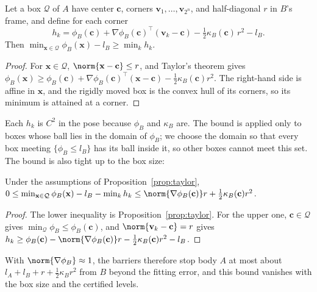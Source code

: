 \begin{proposition}\label{prop:taylor}
Let a box $\mathcal Q$ of $A$ have center $\mathbf c$, corners $\mathbf v_1,\dots,\mathbf v_{2^n}$, and
half-diagonal $r$ in $B$'s frame, and define for each corner
\begin{equation}\label{eq:corner}
h_{k}=\phi_B(\mathbf c)+\nabla\phi_B(\mathbf c)^{\top}(\mathbf v_k-\mathbf c)
-\tfrac12\kappa_B(\mathbf c)\,r^2-l_B .
\end{equation}
Then $\min_{\mathbf x\in\mathcal Q}\phi_B(\mathbf x)-l_B\ge\min_kh_k$.
\end{proposition}
\begin{proof}
For $\mathbf x\in\mathcal Q$, $\norm{\mathbf x-\mathbf c}\le r$, and Taylor's theorem gives
$\phi_B(\mathbf x)\ge\phi_B(\mathbf c)+\nabla\phi_B(\mathbf c)^\top(\mathbf x-\mathbf c)
-\tfrac12\kappa_B(\mathbf c)r^2$. The right-hand side is affine in $\mathbf x$, and the rigidly moved
box is the convex hull of its corners, so its minimum is attained at a corner.
\end{proof}
Each $h_k$ is $C^2$ in the pose because $\phi_B$ and $\kappa_B$ are. The bound is applied only to
boxes whose ball lies in the domain of $\phi_B$; we choose the domain so that every box meeting
$\{\phi_B\le l_B\}$ has its ball inside it, so other boxes cannot meet this set. The bound is also
tight up to the box size:
\begin{proposition}\label{prop:tight}
Under the assumptions of Proposition~\ref{prop:taylor},
$0\le\min_{\mathbf x\in\mathcal Q}\phi_B(\mathbf x)-l_B-\min_kh_k\le\norm{\nabla\phi_B(\mathbf c)}r
+\tfrac12\kappa_B(\mathbf c)r^2$.
\end{proposition}
\begin{proof}
The lower inequality is Proposition~\ref{prop:taylor}. For the upper one, $\mathbf c\in\mathcal Q$
gives $\min_{\mathcal Q}\phi_B\le\phi_B(\mathbf c)$, and $\norm{\mathbf v_k-\mathbf c}=r$ gives
$h_k\ge\phi_B(\mathbf c)-\norm{\nabla\phi_B(\mathbf c)}r-\tfrac12\kappa_B(\mathbf c)r^2-l_B$.
\end{proof}
With $\norm{\nabla\phi_B}\approx1$, the barriers therefore stop body $A$ at most about
$l_A+l_B+r+\tfrac12\kappa_Br^2$ from $B$ beyond the fitting error, and this bound vanishes with the
box size and the certified levels.

